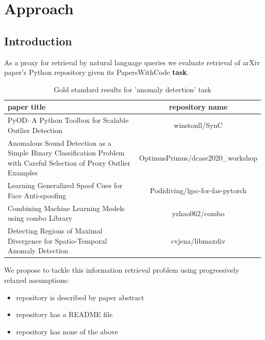 \documentclass[11pt]{report}
\begin{document}
\chapter{Approach}

\section{Introduction}

As a proxy for retrieval by natural language queries we  evaluate retrieval of arXiv paper's Python repository given its PapersWithCode \textbf{task}.


\begin{table}[hbt!]
\caption{Gold standard results for 'anomaly detection' task}
\begin{tabular}{|p{6cm}|c|}
\hline                                                                                                                paper title &                                repository name\\ \hline
\midrule
                                                                PyOD: A Python Toolbox for Scalable Outlier Detection &                      winstonll/SynC \\ \hline
 Anomalous Sound Detection as a Simple Binary Classification Problem with Careful Selection of Proxy Outlier Examples &    OptimusPrimus/dcase2020\_workshop \\ \hline
                                                               Learning Generalized Spoof Cues for Face Anti-spoofing &     Podidiving/lgsc-for-fas-pytorch \\ \hline
                                                                Combining Machine Learning Models using combo Library &                      yzhao062/combo \\ \hline
                                        Detecting Regions of Maximal Divergence for Spatio-Temporal Anomaly Detection &                    cvjena/libmaxdiv \\ \hline
\end{tabular}
\end{table}

\newpage 
We propose to tackle this information retrieval problem using progressively
relaxed  
assumptions: 

\begin{itemize}
\item repository is described by paper abstract
\item repository has a README file
\item repository has none of the above 
\end{itemize}
\end{document}
